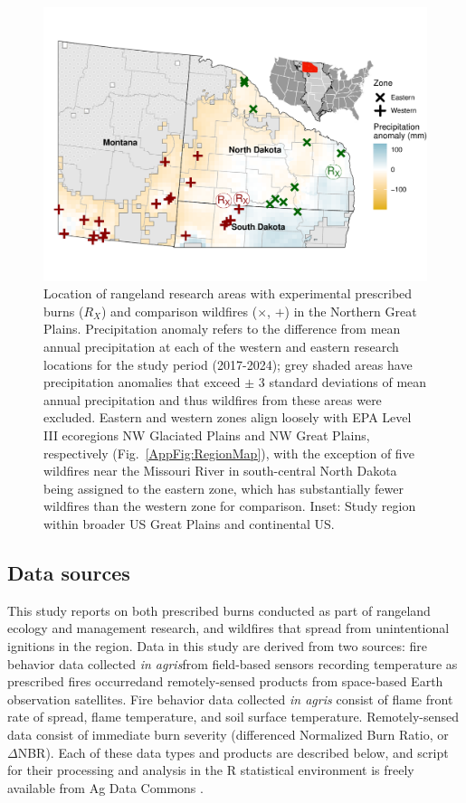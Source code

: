 \documentclass[fire,article,submit,oneauthor,pdftex]{Definitions/mdpi}
\begin{document}
\begin{figure}[H]
	\centering
	\includegraphics[width=1\columnwidth]{study_map-1.pdf}
	\caption{Location of rangeland research areas with experimental prescribed burns ($R_{X}$) and comparison wildfires ($\times$, $+$) in the Northern Great Plains. 
		Precipitation anomaly refers to the difference from mean annual precipitation at each of the western and eastern research locations for the study period (2017-2024); grey shaded areas have precipitation anomalies that exceed $\pm$ 3 standard deviations of mean annual precipitation and thus wildfires from these areas were excluded.
		Eastern and western zones align loosely with EPA Level III ecoregions NW Glaciated Plains and NW Great Plains, respectively (Fig.~\ref{AppFig:RegionMap}), with the exception of five wildfires near the Missouri River in south-central North Dakota being assigned to the eastern zone, which has substantially fewer wildfires than the western zone for comparison. 
		Inset: Study region within broader US Great Plains and continental US. }
	\label{Fig:StudyMap} %
\end{figure}

\subsection{Data sources} 

This study reports on both prescribed burns conducted as part of rangeland ecology and management research, and wildfires that spread from unintentional ignitions in the region.
Data in this study are derived from two sources: fire behavior data collected \emph{in agris}\textemdash from field-based sensors recording temperature as prescribed fires occurred\textemdash and remotely-sensed products from space-based Earth observation satellites. 
Fire behavior data collected \emph{in agris} consist of flame front rate of spread, flame temperature, and soil surface temperature. 
Remotely-sensed data consist of immediate burn severity (differenced Normalized Burn Ratio, or $\Delta$NBR). 
Each of these data types and products are described below, and script for their processing and analysis in the \textsf{R} statistical environment \cite{rcoreteam2024} is freely available from Ag Data Commons \cite{mcgranahan2025b}.
\end{document}
